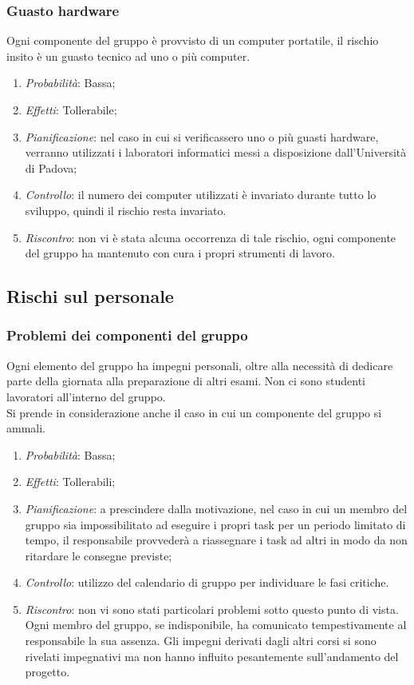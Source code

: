 		\subsubsection{Guasto hardware}
		
Ogni componente del gruppo è provvisto di un computer portatile, il rischio insito è un guasto tecnico ad uno o più computer.
\begin{enumerate}
\item \textit{Probabilità}: Bassa;
\item \textit{Effetti}: Tollerabile;
\item \textit{Pianificazione}: nel caso in cui si verificassero uno o più guasti hardware, verranno utilizzati i laboratori informatici messi a disposizione dall'Università di Padova;
\item \textit{Controllo}: il numero dei computer utilizzati è invariato durante tutto lo sviluppo, quindi il rischio resta invariato.
\item \textit{Riscontro}: non vi è stata alcuna occorrenza di tale rischio, ogni componente del gruppo ha mantenuto con cura i propri strumenti di lavoro.
\end{enumerate}	
	
	
	\subsection{Rischi sul personale}
		\subsubsection{Problemi dei componenti del gruppo}
		
Ogni elemento del gruppo ha impegni personali, oltre alla necessità di dedicare parte della giornata alla preparazione di altri esami. Non ci sono studenti lavoratori all'interno del gruppo. \\
Si prende in considerazione anche il caso in cui un componente del gruppo si ammali. 		
\begin{enumerate}
\item \textit{Probabilità}: Bassa;
\item \textit{Effetti}: Tollerabili;
\item \textit{Pianificazione}: a prescindere dalla motivazione, nel caso in cui un membro del gruppo sia impossibilitato ad eseguire i propri task per un periodo limitato di tempo, il responsabile provvederà a riassegnare i task ad altri in modo da non ritardare le consegne previste;
\item \textit{Controllo}: utilizzo del calendario di gruppo per individuare le fasi critiche.
\item \textit{Riscontro}: non vi sono stati particolari problemi sotto questo punto di vista. Ogni membro del gruppo, se indisponibile, ha comunicato tempestivamente al responsabile la sua assenza. Gli impegni derivati dagli altri corsi si sono rivelati impegnativi ma non hanno influito pesantemente sull'andamento del progetto.
\end{enumerate}

